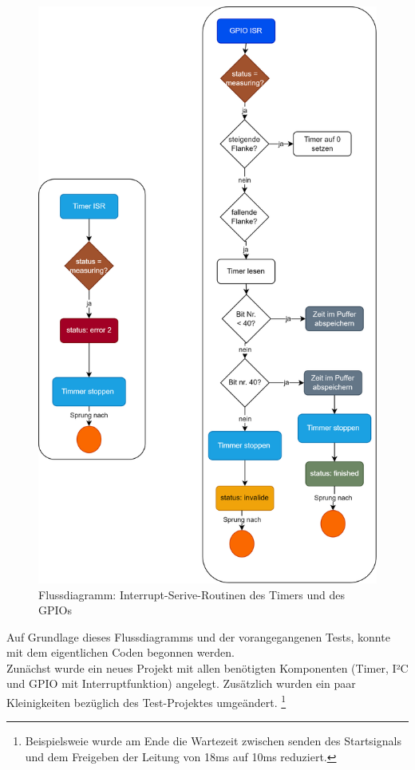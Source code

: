 \documentclass[11pt,a4paper,titlepage]{article}
\begin{document}
\begin{figure}[H]
    \centering
    \includegraphics[height=0.9\textheight]{./Bilder-Tobit/flussdiagramm_ISR.png}
    \caption{Flussdiagramm: Interrupt-Serive-Routinen des Timers und des GPIOs}
    \label{fig:flussdiagramm_ISR}
\end{figure}

\newpage

Auf Grundlage dieses Flussdiagramms und der vorangegangenen Tests, konnte mit dem eigentlichen Coden begonnen werden.\\
Zunächst wurde ein neues Projekt mit allen benötigten Komponenten (Timer, I²C und GPIO mit Interruptfunktion) angelegt.
Zusätzlich wurden ein paar Kleinigkeiten bezüglich des Test-Projektes umgeändert.
\footnote{Beispielsweie wurde am Ende die Wartezeit zwischen senden des Startsignals und dem Freigeben der Leitung von 18ms auf 10ms reduziert.}
\end{document}
